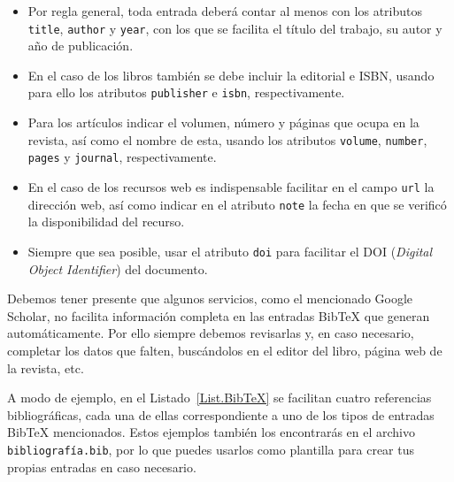\begin{itemize}
    \item  Por regla general, toda entrada deberá contar al menos con los atributos \texttt{title}, \texttt{author} y \texttt{year}, con los que se facilita el título del trabajo, su autor y año de publicación. 
    
    \item En el caso de los libros también se debe incluir la editorial e ISBN, usando para ello los atributos \texttt{publisher} e \texttt{isbn}, respectivamente.
    
    \item Para los artículos indicar el volumen, número y páginas que ocupa en la revista, así como el nombre de esta, usando los atributos \texttt{volume}, \texttt{number}, \texttt{pages} y \texttt{journal}, respectivamente.
    
    \item En el caso de los recursos web es indispensable facilitar en el campo \texttt{url} la dirección web, así como indicar en el atributo \texttt{note} la fecha en que se verificó la disponibilidad del recurso.
    
    \item Siempre que sea posible, usar el atributo \texttt{doi} para facilitar el DOI (\textit{Digital Object Identifier}) del documento.
\end{itemize}

Debemos tener presente que algunos servicios, como el mencionado Google Scholar, no facilita información completa en las entradas BibTeX que generan automáticamente. Por ello siempre debemos revisarlas y, en caso necesario, completar los datos que falten, buscándolos en el editor del libro, página web de la revista, etc.

A modo de ejemplo, en el Listado~\ref{List.BibTeX} se facilitan cuatro referencias bibliográficas, cada una de ellas correspondiente a uno de los tipos de entradas BibTeX mencionados. Estos ejemplos también los encontrarás en el archivo \texttt{bibliografía.bib}, por lo que puedes usarlos como plantilla para crear tus propias entradas en caso necesario.

